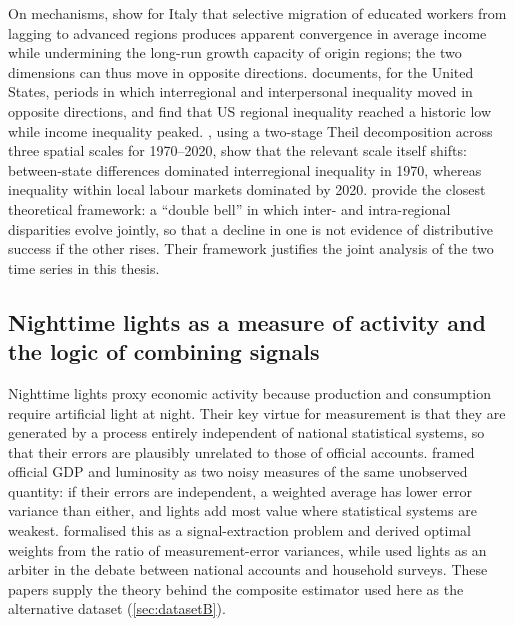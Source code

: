 \documentclass[11pt,a4paper]{article}
\begin{document}
On mechanisms, \citet{Fratesi2014} show for Italy that selective migration of educated workers from lagging to advanced regions produces apparent convergence in average income while undermining the long-run growth capacity of origin regions; the two dimensions can thus move in opposite directions. \citet{Rey2018} documents, for the United States, periods in which interregional and interpersonal inequality moved in opposite directions, and \citet{KhanSiddique2021} find that US regional inequality reached a historic low while income inequality peaked. \citet{LeeBreau2026}, using a two-stage Theil decomposition across three spatial scales for 1970--2020, show that the relevant scale itself shifts: between-state differences dominated interregional inequality in 1970, whereas inequality within local labour markets dominated by 2020. \citet{CapelloCerisola2024} provide the closest theoretical framework: a ``double bell'' in which inter- and intra-regional disparities evolve jointly, so that a decline in one is not evidence of distributive success if the other rises. Their framework justifies the joint analysis of the two time series in this thesis.

\subsection{Nighttime lights as a measure of activity and the logic of combining signals}

Nighttime lights proxy economic activity because production and consumption require artificial light at night. Their key virtue for measurement is that they are generated by a process entirely independent of national statistical systems, so that their errors are plausibly unrelated to those of official accounts. \citet{ChenNordhaus2011} framed official GDP and luminosity as two noisy measures of the same unobserved quantity: if their errors are independent, a weighted average has lower error variance than either, and lights add most value where statistical systems are weakest. \citet{HendersonStoreygardWeil2012} formalised this as a signal-extraction problem and derived optimal weights from the ratio of measurement-error variances, while \citet{PinkovskiySalaiMartin2016} used lights as an arbiter in the debate between national accounts and household surveys. These papers supply the theory behind the composite estimator used here as the alternative dataset (\cref{sec:datasetB}).
\end{document}
